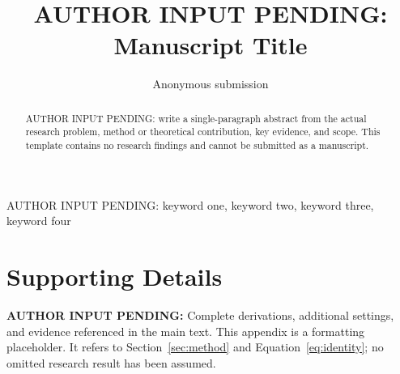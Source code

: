 \documentclass[journal]{IEEEtran}
\title{AUTHOR INPUT PENDING: Manuscript Title}\author{Anonymous submission}
\newcommand{\AuthorPending}[1]{\textbf{AUTHOR INPUT PENDING:} #1}
\begin{document}
\maketitle
\begin{abstract}
AUTHOR INPUT PENDING: write a single-paragraph abstract from the actual research problem,
method or theoretical contribution, key evidence, and scope. This template contains
no research findings and cannot be submitted as a manuscript.
\end{abstract}
\begin{IEEEkeywords}AUTHOR INPUT PENDING: keyword one, keyword two, keyword three, keyword four\end{IEEEkeywords}


\appendix
\section{Supporting Details}
\label{app:supporting}
\AuthorPending{Complete derivations, additional settings, and evidence referenced in the main text.}
This appendix is a formatting placeholder. It refers to Section~\ref{sec:method} and
Equation~\ref{eq:identity}; no omitted research result has been assumed.
\end{document}
